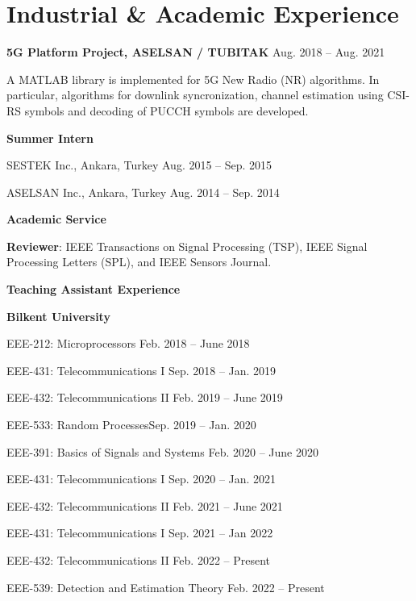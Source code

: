 \section{Industrial \& Academic Experience}
\textbf{5G Platform Project, ASELSAN / TUBITAK}     \hspace{\fill} Aug. 2018 -- Aug. 2021 \\
 \halfblankline
\begin{outerlist}
\item [] A MATLAB library is implemented for 5G New Radio (NR) algorithms. In particular, algorithms for downlink syncronization, channel estimation using CSI-RS symbols and decoding of PUCCH symbols are developed.
\end{outerlist}	 
\textbf{Summer Intern}
\halfblankline
\begin{outerlist}
	\item [] {SESTEK} Inc., Ankara, Turkey     \hspace{\fill} Aug. 2015 -- Sep. 2015 \\
	\halfblankline
	\item [] {ASELSAN} Inc., Ankara, Turkey     \hspace{\fill} Aug. 2014 -- Sep. 2014 
\end{outerlist}

\textbf{Academic Service}
\halfblankline
\begin{outerlist}
	\item[] \textbf{Reviewer}: IEEE Transactions on Signal Processing (TSP), IEEE Signal Processing Letters (SPL), and IEEE Sensors Journal.
\end{outerlist}

\textbf{Teaching Assistant Experience}
\halfblankline
\begin{outerlist}
	\item[] \textbf{Bilkent University}
	\begin{innerlist}
		\item[] EEE-212: Microprocessors \hfill Feb. 2018 -- June 2018
		\item[] EEE-431: Telecommunications I \hfill Sep. 2018 -- Jan. 2019
		\item[] EEE-432: Telecommunications II \hfill Feb. 2019 -- June 2019
		\item[] EEE-533: Random Processes\hfill Sep. 2019 -- Jan. 2020
		\item[] EEE-391: Basics of Signals and Systems \hfill Feb. 2020 -- June 2020
		\item[] EEE-431: Telecommunications I  \hfill Sep. 2020 -- Jan. 2021
		\item[]EEE-432: Telecommunications II  \hfill Feb. 2021 -- June 2021
		\item[] EEE-431: Telecommunications I  \hfill Sep. 2021 -- Jan 2022
		\item[]EEE-432: Telecommunications II  \hfill Feb. 2022 -- Present
		\item[]EEE-539: Detection and Estimation Theory  \hfill Feb. 2022 -- Present
	\end{innerlist}
\end{outerlist}


